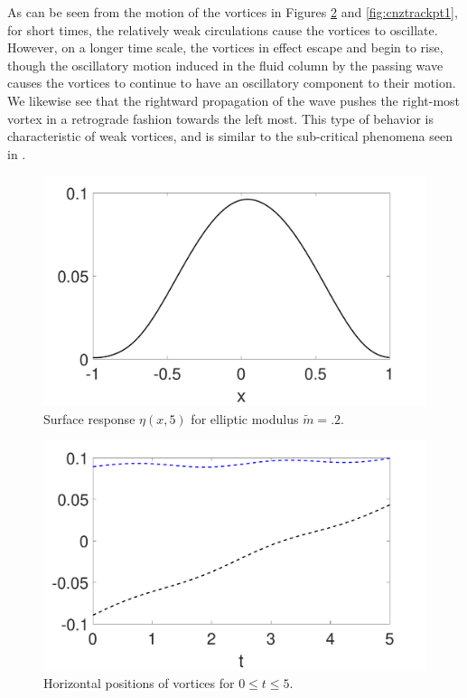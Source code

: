 \documentclass[a4paper,11pt]{article}
\begin{document}
As can be seen from the motion of the vortices in Figures \ref{fig:cnxtrackpt1} and \ref{fig:cnztrackpt1}, for short times, the relatively weak circulations cause the vortices to oscillate.  However, on a longer time scale, the vortices in effect escape and begin to rise, though the oscillatory motion induced in the fluid column by the passing wave causes the vortices to continue to have an oscillatory component to their motion.  We likewise see that the rightward propagation of the wave pushes the right-most vortex in a retrograde fashion towards the left most.  This type of behavior is characteristic of weak vortices, and is similar to the sub-critical phenomena seen in \cite{tyvand2}.
\begin{figure}[!h]
\centering
\includegraphics[width=.75\textwidth]{surf_resp_cnoid_mu_pt2_F_1_tf_5_gam_pt1}
\caption{Surface response $\eta(x,5)$ for elliptic modulus $\tilde{m}=.2$.}
\label{fig:surfrepcn}
\end{figure}
\begin{figure}[!h]
\centering
\includegraphics[width=.75\textwidth]{xtrack_cnoid_mu_pt2_F_1_tf_5_gam_pt1}
\caption{Horizontal positions of vortices for $0\leq t \leq 5$.}
\label{fig:cnxtrackpt1}
\end{figure}
\end{document}
